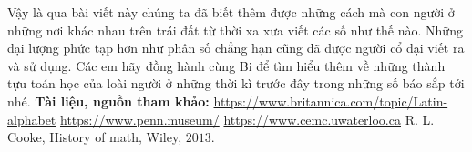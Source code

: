 	\vskip 0.1cm
	Vậy là qua bài viết này chúng ta đã biết thêm được những cách mà con người ở những nơi khác nhau trên trái đất từ thời xa xưa viết các số như thế nào. Những đại lượng phức tạp hơn như phân số chẳng hạn cũng đã được người cổ đại viết ra và sử dụng. Các em hãy đồng hành cùng Bi để tìm hiểu thêm về những thành tựu toán học của loài người ở những thời kì trước đây trong những số báo sắp tới nhé. 
	\vskip 0.1cm
	\textbf{\color{toancuabi}Tài liệu, nguồn tham khảo:}
	\vskip 0.1cm
	\url{https://www.britannica.com/topic/Latin-alphabet}
	\vskip 0.1cm
	\url{https://www.penn.museum/}
	\vskip 0.1cm
	\url{https://www.cemc.uwaterloo.ca}
	\vskip 0.1cm
	R. L. Cooke, History of math, Wiley, $2013$.